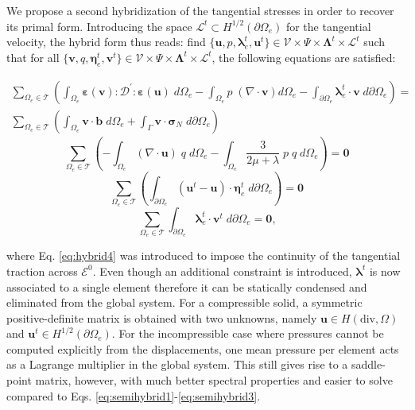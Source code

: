 \documentclass{wccm2024}
\begin{document}
We propose a second hybridization of the tangential stresses in order to recover its primal form. Introducing the space $\mathcal{L}^t \subset H^{1/2}(\partial\Omega_e)$ for the tangential velocity, the hybrid form thus reads: find $\{\mathbf{u},p,\boldsymbol{\lambda}^t_e,\mathbf{u}^t\} \in \mathcal{V} \times \Psi \times \boldsymbol{\Lambda}^t \times \mathcal{L}^t$ such that for all $\{\mathbf{v},q,\boldsymbol{\eta}^t_e,\mathbf{v}^t\} \in \mathcal{V} \times \Psi \times \boldsymbol{\Lambda}^t\times \mathcal{L}^t$, the following equations are satisfied:

\begin{equation} \label{eq:hybrid1}
    \begin{split}
        \sum_{\Omega_e \in \mathcal{T}} \left( \int_{\Omega_e} \boldsymbol{\varepsilon}(\mathbf{v}) : \mathcal{D}^{'} : \boldsymbol{\varepsilon}(\mathbf{u})\; d\Omega_e - \int_{\Omega_e} p \;(\nabla \cdot \mathbf{v}) d\Omega_e - \int_{\partial\Omega_e} \boldsymbol{\lambda}^t_e \cdot \mathbf{v}\; d\partial\Omega_e \right) = \\ \sum_{\Omega_e \in \mathcal{T}} \left( \int_{\Omega_e} \mathbf{v} \cdot \mathbf{b} \;d\Omega_e + \int_{\Gamma} \mathbf{v} \cdot \boldsymbol{\sigma}_N\; d\partial\Omega_e \right)
    \end{split}
\end{equation}
\begin{equation} \label{eq:hybrid2}
    \sum_{\Omega_e \in \mathcal{T}} \left(-\int_{\Omega_e} (\nabla \cdot \mathbf{u})\; q \;d\Omega_e -\int_{\Omega_e} \frac{3}{2\mu+\lambda}\;p \;q \;d\Omega_e \right) = \mathbf{0}
\end{equation}
\begin{equation} \label{eq:hybrid3}
    \sum_{\Omega_e \in \mathcal{T}} \left(\int_{\partial\Omega_e} (\mathbf{u}^t-\mathbf{u}) \cdot \boldsymbol{\eta}^t_e\; d\partial\Omega_e \right)  = \mathbf{0}
\end{equation}
\begin{equation} \label{eq:hybrid4}
    \sum_{\Omega_e \in \mathcal{T}} \int_{\partial\Omega_e} \boldsymbol{\lambda}^t_e \cdot \mathbf{v}^t\; d\partial\Omega_e = \mathbf{0} \text{,}
\end{equation}

\noindent where Eq. \eqref{eq:hybrid4} was introduced to impose the continuity of the tangential traction across $\mathcal{E}^0$. Even though an additional constraint is introduced, $\boldsymbol{\lambda}^t$ is now associated to a single element therefore it can be statically condensed and eliminated from the global system. For a compressible solid, a symmetric positive-definite matrix is obtained with two unknowns, namely $\mathbf{u} \in H(\text{div},\Omega)$ and $\mathbf{u}^t \in H^{1/2}(\partial\Omega_e)$. For the incompressible case where pressures cannot be computed explicitly from the displacements, one mean pressure per element acts as a Lagrange multiplier in the global system. This still gives rise to a saddle-point matrix, however, with much better spectral properties and easier to solve compared to Eqs. \eqref{eq:semihybrid1}-\eqref{eq:semihybrid3}.
\end{document}
